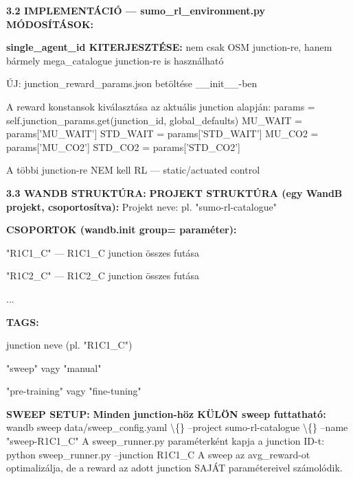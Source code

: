 \documentclass[11pt,a4paper]{article}
\begin{document}
\textbf{3.2 IMPLEMENTÁCIÓ — sumo\_rl\_environment.py MÓDOSÍTÁSOK:}
\par\noindent\hspace*{1em}\textbullet{} \textbf{single\_agent\_id KITERJESZTÉSE:} nem csak OSM junction-re,
hanem bármely mega\_catalogue junction-re is használható
\par\noindent\hspace*{1em}\textbullet{} ÚJ: junction\_reward\_params.json betöltése \_\_init\_\_-ben
\par\noindent\hspace*{1em}\textbullet{} A reward konstansok kiválasztása az aktuális junction alapján:
params = self.junction\_params.get(junction\_id, global\_defaults)
MU\_WAIT = params['MU\_WAIT']
STD\_WAIT = params['STD\_WAIT']
MU\_CO2 = params['MU\_CO2']
STD\_CO2 = params['STD\_CO2']
\par\noindent\hspace*{1em}\textbullet{} A többi junction-re NEM kell RL — static/actuated control

\textbf{3.3 WANDB STRUKTÚRA:}
\textbf{PROJEKT STRUKTÚRA (egy WandB projekt, csoportosítva):}
Projekt neve: pl. "sumo-rl-catalogue"

\textbf{CSOPORTOK (wandb.init group= paraméter):}
\par\noindent\hspace*{1em}\textbullet{} "R1C1\_C" — R1C1\_C junction összes futása
\par\noindent\hspace*{1em}\textbullet{} "R1C2\_C" — R1C2\_C junction összes futása
\par\noindent\hspace*{1em}\textbullet{} ...

\textbf{TAGS:}
\par\noindent\hspace*{1em}\textbullet{} junction neve (pl. "R1C1\_C")
\par\noindent\hspace*{1em}\textbullet{} "sweep" vagy "manual"
\par\noindent\hspace*{1em}\textbullet{} "pre-training" vagy "fine-tuning"

\textbf{SWEEP SETUP:}
\textbf{Minden junction-höz KÜLÖN sweep futtatható:}
wandb sweep data/sweep\_config.yaml \textbackslash\{\}
--project sumo-rl-catalogue \textbackslash\{\}
--name "sweep-R1C1\_C"
A sweep\_runner.py paraméterként kapja a junction ID-t:
python sweep\_runner.py --junction R1C1\_C
A sweep az avg\_reward-ot optimalizálja, de a reward
az adott junction SAJÁT paramétereivel számolódik.
\end{document}
